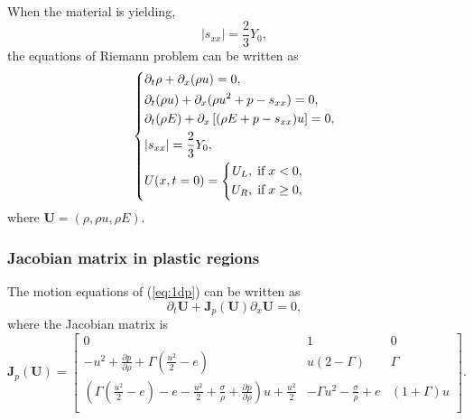\documentclass{article}
\numberwithin{equation}{section}
\numberwithin{table}{section}
\begin{document}
When the material is yielding,
\begin{equation}\label{eq:sxxp}
  |s_{xx}| = \frac{2}{3}Y_0,
\end{equation}
the equations of Riemann problem  can be written as
\begin{equation}\label{eq:1dp}
   \left\{ \begin{aligned}
       & \partial _t \rho +\partial_x(\rho u)=0,\\
       & \partial _t (\rho u)+\partial_x(\rho u^2 + p -s_{xx})=0,\\
       &\partial _t (\rho E)+\partial_x\left[(\rho E + p -s_{xx})u\right]=0,\\
& |s_{xx}| = \frac{2}{3}Y_{0}, \\
       &U(x,t = 0) = \left\{\begin{aligned}
           U_L, \hspace{0.1cm} \text{if} \hspace{0.1cm} x<0, \\
           U_R, \hspace{0.1cm} \text{if} \hspace{0.1cm} x\ge 0, \\
       \end{aligned}\right.
     \end{aligned}
  \right.
\end{equation}
where $\mathbf{U} = (\rho, \rho u, \rho E )$.
  \subsubsection{Jacobian matrix in  plastic  regions}
 The motion equations of (\ref{eq:1dp}) can be written as
\begin{equation}
  \partial_t \mathbf{{U}} + \mathbf{J}_p(\mathbf{U})\partial_x \mathbf{{U}}= 0,
\end{equation}
 where the Jacobian matrix is
\begin{equation}
\mathbf{J}_p(\mathbf{U}) = \left[\begin{array}{lll}
      0 & 1 & 0   \\
      -u^2 + \frac{\partial p}{\partial \rho} +\Gamma(\frac{u^2}{2}-e)& u(2-\Gamma)& \Gamma \\
	  (\Gamma(\frac{u^2}{2}-e)-e-\frac{u^2}{2}+\frac{\sigma}{\rho}+\frac{\partial p}{\partial \rho})u +\frac{u^2}{2} & -\Gamma u^2 -\frac{\sigma}{\rho} +e & (1+\Gamma)u\\
\end{array}
\right].
\end{equation}
\end{document}
